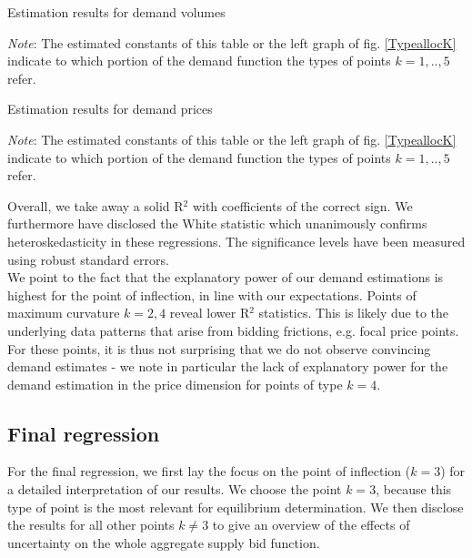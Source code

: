 \begin{table}[!ht]
\vspace{2cm}
\begin{center}

\caption{\label{VolDEPur52} Estimation results for demand volumes}
\end{center}
\emph{Note}: The estimated constants of this table or the left graph of fig. \ref{TypeallocK} indicate to which portion of the demand function the types of points $k=1,..,5$ refer. \\
\end{table}

\begin{table}[!ht]
\begin{center}

\caption{\label{PriceDEPur52} Estimation results for demand prices }
\end{center}
\emph{Note}: The estimated constants of this table or the left graph of fig. \ref{TypeallocK} indicate to which portion of the demand function the types of points $k=1,..,5$ refer. \\
\end{table}
\restoregeometry


Overall, we take away a solid R$^2$ with coefficients of the correct sign. We furthermore have disclosed the White statistic which unanimously confirms heteroskedasticity in these regressions. The significance levels have been measured using robust standard errors. \\

We point to the fact that the explanatory power of our demand estimations is highest for the point of inflection, in line with our expectations. Points of maximum curvature $k=2,4$ reveal lower R$^2$ statistics. This is likely due to the underlying data patterns that arise from bidding frictions, e.g. focal price points. For these points, it is thus not surprising that we do not observe convincing demand estimates - we note in particular the lack of explanatory power for the demand estimation in the price dimension for points of type $k=4$. \\

\subsection{Final regression}
\label{discident}
For the final regression, we first lay the focus on the point of inflection ($k=3$) for a detailed interpretation of our results. We choose the point $k=3$, because this type of point is the most relevant for equilibrium determination. We then disclose the results for all other points $k \neq 3$ to give an overview of the effects of uncertainty on the whole aggregate supply bid function. \\

